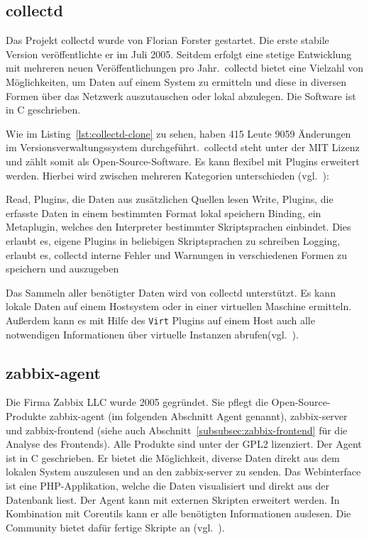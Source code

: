 \subsection{collectd}
Das Projekt collectd wurde von Florian Forster gestartet. Die erste stabile
Version veröffentlichte er im Juli 2005. Seitdem erfolgt eine stetige
Entwicklung mit mehreren neuen Veröffentlichungen pro Jahr.\ collectd bietet
eine Vielzahl von Möglichkeiten, um Daten auf einem System zu ermitteln und
diese in diversen Formen über das Netzwerk auszutauschen oder lokal abzulegen.
Die Software ist in C geschrieben.

Wie im Listing~\ref{lst:collectd-clone} zu sehen, haben 415 Leute 9059
Änderungen im Versionsverwaltungssystem durchgeführt.\ collectd steht unter der
MIT Lizenz und zählt somit als Open-Source-Software. Es kann flexibel mit
Plugins erweitert werden. Hierbei wird zwischen mehreren Kategorien
unterschieden (vgl.~\cite{collectd_plugins}):

\begin{outline}
  \1 Read, Plugins, die Daten aus zusätzlichen Quellen lesen
  \1 Write, Plugins, die erfasste Daten in einem bestimmten Format lokal
  speichern
  \1 Binding, ein Metaplugin, welches den Interpreter bestimmter Skriptsprachen
  einbindet. Dies erlaubt es, eigene Plugins in beliebigen Skriptsprachen zu
  schreiben
  \1 Logging, erlaubt es, collectd interne Fehler und Warnungen in verschiedenen
  Formen zu speichern und auszugeben
\end{outline}

Das Sammeln aller benötigter Daten wird von collectd unterstützt. Es kann
lokale Daten auf einem Hostsystem oder in einer virtuellen Maschine ermitteln.
Außerdem kann es mit Hilfe des \texttt{Virt} Plugins auf einem Host auch alle
notwendigen Informationen über virtuelle Instanzen
abrufen(vgl.~\cite{collectd_virt_plugins}).
\tm%

\subsection{zabbix-agent}
Die Firma Zabbix LLC wurde 2005 gegründet. Sie pflegt die Open-Source-Produkte
zabbix-agent (im folgenden Abschnitt Agent genannt), zabbix-server und
zabbix-frontend (siehe auch Abschnitt~\ref{subsubsec:zabbix-frontend} für die
Analyse des Frontends). Alle Produkte sind unter der GPL2 lizenziert. Der Agent
ist in C geschrieben. Er bietet die Möglichkeit, diverse Daten direkt aus dem
lokalen System auszulesen und an den zabbix-server zu senden. Das Webinterface
ist eine PHP-Applikation, welche die Daten visualisiert und direkt aus der
Datenbank liest. Der Agent kann mit externen Skripten erweitert werden. In
Kombination mit Coreutils kann er alle benötigten Informationen auslesen. Die
Community bietet dafür fertige Skripte an (vgl.~\cite{zabbix_virt_plugins}).

